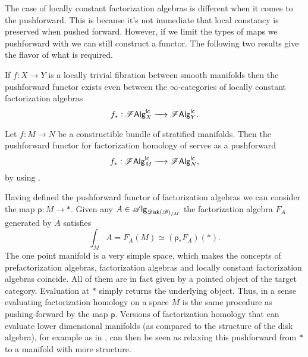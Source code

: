 \documentclass[../text]{subfiles}
\begin{document}
The case of locally constant factorization algebras is different when it comes to the pushforward. This is because it's not immediate that local constancy is preserved when pushed forward. However, if we limit the types of maps we pushforward with we can still construct a functor. The following two results give the flavor of what is required.

\begin{proposition}
    If $f: X \rightarrow Y$ is a locally trivial fibration between smooth manifolds then the pushforward functor exists even between the $\infty$-categories of locally constant factorization algebras
    \begin{equation}
        f_*: \mathscr{F} \mathsf{Alg}^{\mathsf{lc}}_X \xrightarrow{\quad} \mathscr{F} \mathsf{Alg}^{\mathsf{lc}}_Y.
    \end{equation}
\end{proposition}

\begin{corollary}\label{cor:pushforward_for_lc}
    Let $f: M \xrightarrow{} N$ be a constructible bundle of stratified manifolds. Then the pushforward functor for factorization homology of  serves as a pushforward
    \begin{equation}
        f_*: \mathscr{F} \mathsf{Alg}^{\mathsf{lc}}_M \xrightarrow{\quad} \mathscr{F} \mathsf{Alg}^{\mathsf{lc}}_N,
    \end{equation}
    by using .
\end{corollary}

\begin{remark}\label{rem:fh_is_pushingforward}
    Having defined the pushforward functor of factorization algebras we can consider the map $\mathsf{p}:M \rightarrow *$. Given any $A \in \alg{\disk(\bstr)_{/M}}$ the factorization algebra $F_A$ generated by $A$ satisfies
    \begin{equation}
        \int_M A  = F_A(M) \simeq (\mathsf{p}_* F_A)(*).
    \end{equation}
    The one point manifold is a very simple space, which makes the concepts of prefactorization algebras, factorization algebras and locally constant factorization algebras coincide. All of them are in fact given by a pointed object of the target category. Evaluation at $*$ simply returns the underlying object. Thus, in a sense evaluating factorization homology on a space $M$ is the same procedure as pushing-forward by the map $\mathsf{p}$. Versions of factorization homology that can evaluate lower dimensional manifolds (as compared to the structure of the disk algebra), for example as in \cite[cor.2.29]{aft_fhstrat}, can then be seen as relaxing this pushforward from $*$ to a manifold with more structure.
\end{remark} 
\end{document}
